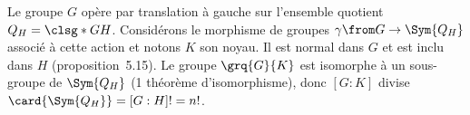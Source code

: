Le groupe $G$ opère par translation à gauche sur l'ensemble quotient $Q_H = \smash{\clsg*{G}{H}}$.
Considérons le morphisme de groupes $\gamma\from G\to\Sym{Q_H}$ associé à cette action et notons $K$ son noyau.
Il est normal dans $G$ et est inclu dans $H$ (proposition~5.15).
Le groupe $\grq{G}{K}$ est isomorphe à un sous-groupe de $\Sym{Q_H}$ (1\ier{} théorème d'isomorphisme), donc $[G:K]$ divise $\card{\Sym{Q_H}} = [G:H]! = n!$.
